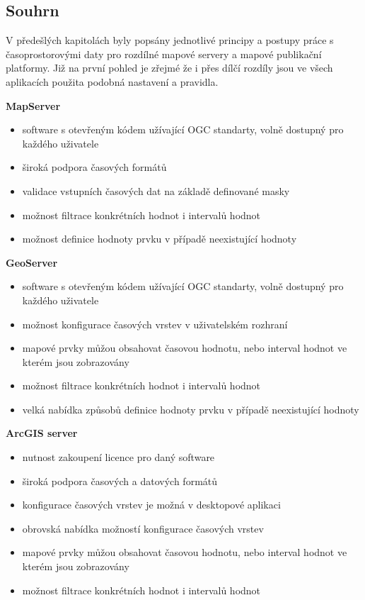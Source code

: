 \newpage
\subsection{Souhrn}
V předešlých kapitolách byly popsány jednotlivé principy a postupy práce s časoprostorovými daty pro rozdílné mapové servery a mapové publikační platformy. Již na první pohled je zřejmé že i přes dílčí rozdíly jsou ve všech aplikacích použita podobná nastavení a pravidla.

\bigskip
\noindent
\textbf{MapServer}
\begin{itemize}
	\item software s otevřeným kódem užívající OGC standarty, volně dostupný pro každého uživatele
	\item široká podpora časových formátů
	\item validace vstupních časových dat na základě definované masky
	\item možnost filtrace konkrétních hodnot i intervalů hodnot
	\item možnost definice hodnoty prvku v případě neexistující hodnoty
\end{itemize}

\textbf{GeoServer}
\begin{itemize}
	\item software s otevřeným kódem užívající OGC standarty, volně dostupný pro každého uživatele
	\item možnost konfigurace časových vrstev v uživatelském rozhraní
	\item mapové prvky můžou obsahovat časovou hodnotu, nebo interval hodnot ve kterém jsou zobrazovány
	\item možnost filtrace konkrétních hodnot i intervalů hodnot
	\item velká nabídka způsobů definice hodnoty prvku v případě neexistující hodnoty
\end{itemize}

\textbf{ArcGIS server}
\begin{itemize}
	\item nutnost zakoupení licence pro daný software
	\item široká podpora časových a datových formátů
	\item konfigurace časových vrstev je možná v desktopové aplikaci
	\item obrovská nabídka možností konfigurace časových vrstev
	\item mapové prvky můžou obsahovat časovou hodnotu, nebo interval hodnot ve kterém jsou zobrazovány
	\item možnost filtrace konkrétních hodnot i intervalů hodnot
\end{itemize}

